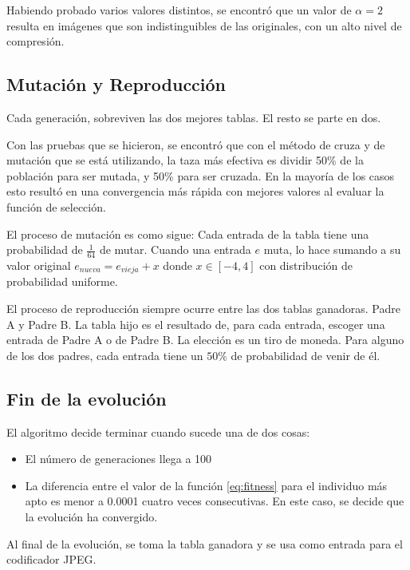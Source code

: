 Habiendo probado varios valores distintos, se encontró que un valor de $\alpha
= 2$ resulta en imágenes que son indistinguibles de las originales, con un alto
nivel de compresión.


\subsection {Mutación y Reproducción}

Cada generación, sobreviven las dos mejores tablas. El resto se parte en dos.

Con las pruebas que se hicieron, se encontró que con el método de cruza y de
mutación que se está utilizando, la taza más efectiva es dividir 50\% de la
población para ser mutada, y 50\% para ser cruzada. En la mayoría de los casos
esto resultó en una convergencia más rápida con mejores valores al evaluar la
función de selección.

El proceso de mutación es como sigue: Cada entrada de la tabla tiene una
probabilidad de $\frac{1}{64}$ de mutar. Cuando una entrada $e$ muta, lo hace
sumando a su valor original $e_{nueva} = e_{vieja} + x $ donde $x \in [-4, 4]$
con distribución de probabilidad uniforme.

El proceso de reproducción siempre ocurre entre las dos tablas ganadoras. Padre
A y Padre B.  La tabla hijo es el resultado de, para cada entrada, escoger una
entrada de Padre A o de Padre B. La elección es un tiro de moneda. Para alguno
de los dos padres, cada entrada tiene un $50\%$ de probabilidad de venir de él.

\subsection {Fin de la evolución}

El algoritmo decide terminar cuando sucede una de dos cosas:

\begin{itemize}
\item El número de generaciones llega a 100
\item La diferencia entre el valor de la función \ref{eq:fitness} para el
individuo más apto es menor a 0.0001 cuatro veces consecutivas. En este caso,
se decide que la evolución ha convergido.
\end{itemize}

Al final de la evolución, se toma la tabla ganadora y se usa como entrada para
el codificador \gls{JPEG}.

